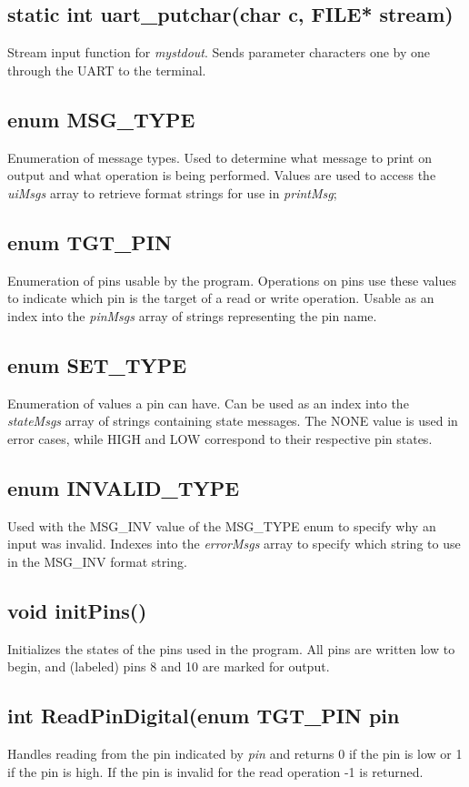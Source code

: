 \documentclass[letterpaper,11pt]{texMemo} %
\begin{document}
\subsection*{static int uart\_putchar(char c, FILE* stream)}
Stream input function for \textit{mystdout}. Sends parameter characters one by one through the UART to the terminal.
\subsection*{enum MSG\_TYPE}
Enumeration of message types. Used to determine what message to print on output and what operation is being performed. Values are used to access the \textit{uiMsgs} array to retrieve format strings for use in \textit{printMsg};
\subsection*{enum TGT\_PIN}
Enumeration of pins usable by the program. Operations on pins use these values to indicate which pin is the target of a read or write operation. Usable as an index into the \textit{pinMsgs} array of strings representing the pin name.
\subsection*{enum SET\_TYPE}
Enumeration of values a pin can have. Can be used as an index into the \textit{stateMsgs} array of strings containing state messages. The NONE value is used in error cases, while HIGH and LOW correspond to their respective pin states.
\subsection*{enum INVALID\_TYPE}
Used with the MSG\_INV value of the MSG\_TYPE enum to specify why an input was invalid. Indexes into the \textit{errorMsgs} array to specify which string to use in the MSG\_INV format string.
\subsection*{void initPins()}
Initializes the states of the pins used in the program. All pins are written low to begin, and (labeled) pins 8 and 10 are marked for output.
\subsection*{int ReadPinDigital(enum TGT\_PIN pin}
Handles reading from the pin indicated by \textit{pin} and returns 0 if the pin is low or 1 if the pin is high. If the pin is invalid for the read operation -1 is returned.
\end{document}
